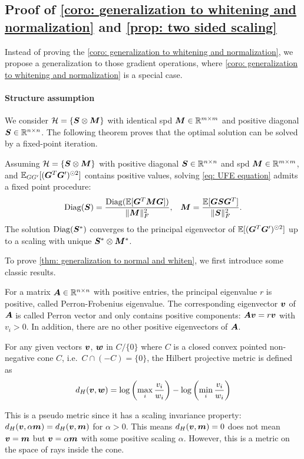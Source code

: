 \subsection{Proof of \cref{coro: generalization to whitening and normalization} and \cref{prop: two sided scaling}}
\label{subapp: proof normalization}
Instead of proving the \cref{coro: generalization to whitening and normalization}, we propose a generalization to those gradient operations, where \cref{coro: generalization to whitening and normalization} is a special case.

\paragraph{Structure assumption} We consider $\mathcal{H}=\{{\bm{S}}\otimes {\bm{M}}\}$ with identical \gls{spd} ${\bm{M}}\in\mathbb{R}^{m\times m}$ and positive diagonal ${\bm{S}}\in\mathbb{R}^{n\times n}$. 
The following theorem proves that the optimal solution can be solved by a fixed-point iteration. 
\begin{theorem}
    Assuming $\mathcal{H}=\{{\bm{S}}\otimes {\bm{M}}\}$ with positive diagonal ${\bm{S}}\in\mathbb{R}^{n\times n}$ and \gls{spd} ${\bm{M}}\in\mathbb{R}^{m\times m}$, and $\mathbb{E}_{GG'}[({\bm{G}}^T{\bm{G}}')^{\odot 2}]$ contains positive values, solving \cref{eq: UFE equation} admits a fixed point procedure:
    \begin{align}
        \operatorname{Diag}({\bm{S}}) = \frac{\operatorname{Diag}(\mathbb{E}[{\bm{G}}^T{\bm{M}}{\bm{G}}])}{\Vert{\bm{M}}\Vert_F^2},\;\;\;
        {\bm{M}}=\frac{\mathbb{E}[{\bm{G}}{\bm{S}}{\bm{G}}^T]}{\Vert{\bm{S}}\Vert_F^2}.
        \label{eq: optimal S and M}
    \end{align}
    The solution $\operatorname{Diag}({\bm{S}}^*)$ converges to the principal eigenvector of $\mathbb{E}[({\bm{G}}^T{\bm{G}}')^{\odot 2}]$ up to a scaling with unique ${\bm{S}}^*\otimes {\bm{M}}^*$. 
    \label{thm: generalization to normal and whiten}
\end{theorem}

To prove \cref{thm: generalization to normal and whiten}, we first introduce some classic results. 
\begin{theorem}
For a matrix ${\bm{A}}\in\mathbb{R}^{n\times n}$ with positive entries, the principal eigenvalue $r$ is positive, called Perron-Frobenius eigenvalue. The corresponding eigenvector ${\bm{v}}$ of ${\bm{A}}$ is called Perron vector and only contains positive components: ${\bm{A}}{\bm{v}}=r{\bm{v}}$ with $v_i>0$. In addition, there are no other positive eigenvectors of ${\bm{A}}$. 
\label{thm: Perron-Frobenius theorem}
\end{theorem}

\begin{definition}
    For any given vectors ${\bm{v}}$, ${\bm{w}}$ in $C\slash \{0\}$ where $C$ is a closed convex pointed non-negative cone $C$, i.e.~$C\cap (-C)=\{0\}$, the Hilbert projective metric is defined as 
    \begin{align*}
        d_H({\bm{v}},{\bm{w}}) = \log \left(\max_i \frac{v_i}{w_i}\right) - \log \left(\min_i \frac{v_i}{w_i}\right)
    \end{align*}
\end{definition}
This is a pseudo metric since it has a scaling invariance property: $d_H({\bm{v}},\alpha{\bm{m}})=d_H({\bm{v}},{\bm{m}})$ for $\alpha>0$. This means $d_H({\bm{v}},{\bm{m}})=0$ does not mean ${\bm{v}}={\bm{m}}$ but ${\bm{v}}=\alpha{\bm{m}}$ with some positive scaling $\alpha$. However, this is a metric on the space of rays inside the cone. 

